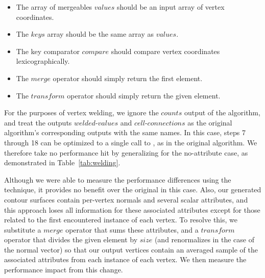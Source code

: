 \documentclass[review,journal]{vgtc}         %
\begin{document}
\begin{itemize}
\item{The array of mergeables $values$ should be an input array of vertex coordinates.}
\item{The $keys$ array should be the same array as $values$.}
\item{The key comparator $compare$ should compare vertex coordinates lexicographically.}
\item{The $merge$ operator should simply return the first element.}
\item{The $transform$ operator should simply return the given element.}
\end{itemize}

For the purposes of vertex welding, we ignore the $counts$ output of the  algorithm, and treat the outputs $welded\mbox{-}values$ and $cell\mbox{-}connections$ as the original  algorithm's corresponding outputs with the same names. In this case, steps 7 through 18 can be optimized to a single call to , as in the original  algorithm. We therefore take no performance hit by generalizing  for the no-attribute case, as demonstrated in Table~\ref{tab:welding}.

Although we were able to measure the performance differences using the  technique, it provides no benefit over the original  in this case. Also, our generated contour surfaces contain per-vertex normals and several scalar attributes, and this approach loses all information for these associated attributes except for those related to the first encountered instance of each vertex. To resolve this, we substitute a $merge$ operator that sums these attributes, and a $transform$ operator that divides the given element by $size$ (and renormalizes in the case of the normal vector) so that our output vertices contain an averaged sample of the associated attributes from each instance of each vertex. We then measure the performance impact from this change.
\end{document}
